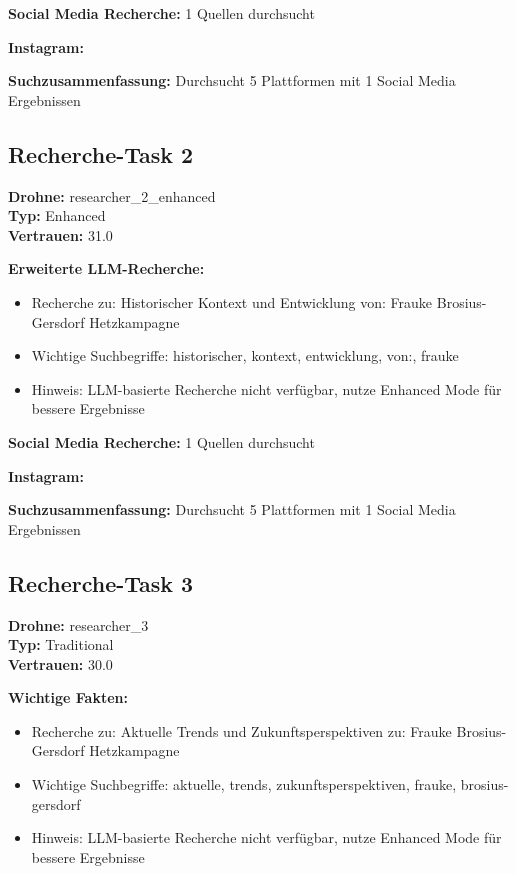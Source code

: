 \documentclass[12pt,a4paper]{article}
\begin{document}
\textbf{Social Media Recherche:} 1 Quellen durchsucht

\textbf{Instagram:}
\begin{itemize}
\end{itemize}

\textbf{Suchzusammenfassung:} Durchsucht 5 Plattformen mit 1 Social Media Ergebnissen

\subsection{Recherche-Task 2}

\textbf{Drohne:} researcher\_2\_enhanced\\
\textbf{Typ:} Enhanced\\
\textbf{Vertrauen:} 31.0%

\textbf{Erweiterte LLM-Recherche:}
\begin{itemize}
\item Recherche zu: Historischer Kontext und Entwicklung von: Frauke Brosius-Gersdorf Hetzkampagne
\item Wichtige Suchbegriffe: historischer, kontext, entwicklung, von:, frauke
\item Hinweis: LLM-basierte Recherche nicht verfügbar, nutze Enhanced Mode für bessere Ergebnisse
\end{itemize}

\textbf{Social Media Recherche:} 1 Quellen durchsucht

\textbf{Instagram:}
\begin{itemize}
\end{itemize}

\textbf{Suchzusammenfassung:} Durchsucht 5 Plattformen mit 1 Social Media Ergebnissen

\subsection{Recherche-Task 3}

\textbf{Drohne:} researcher\_3\\
\textbf{Typ:} Traditional\\
\textbf{Vertrauen:} 30.0%

\textbf{Wichtige Fakten:}
\begin{itemize}
\item Recherche zu: Aktuelle Trends und Zukunftsperspektiven zu: Frauke Brosius-Gersdorf Hetzkampagne
\item Wichtige Suchbegriffe: aktuelle, trends, zukunftsperspektiven, frauke, brosius-gersdorf
\item Hinweis: LLM-basierte Recherche nicht verfügbar, nutze Enhanced Mode für bessere Ergebnisse
\end{itemize}
\end{document}

